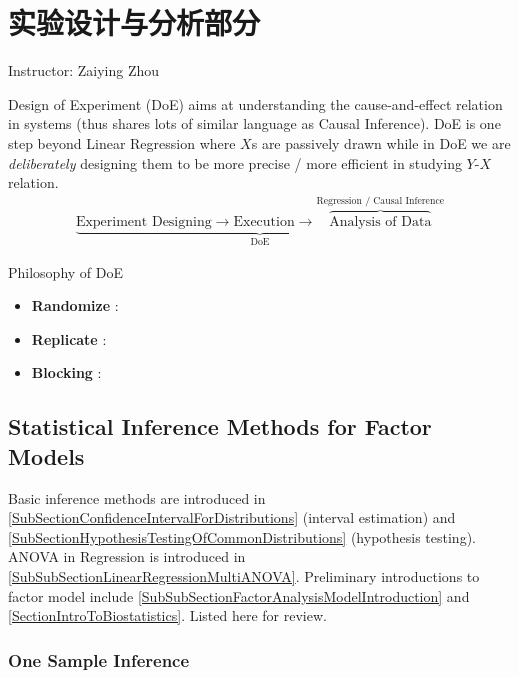 \chapter{实验设计与分析部分}\label{SectionDoE}
\begin{center}
    Instructor: Zaiying Zhou
\end{center}

Design of Experiment (DoE) aims at understanding the cause-and-effect relation in systems (thus shares lots of similar language as Causal Inference). DoE is one step beyond Linear Regression where $ X $s are passively drawn while in DoE we are \textit{deliberately} designing them to be more precise / more efficient in studying $ Y$-$X $ relation.
\begin{align}
    \underbrace{\text{Experiment Designing}\longrightarrow \text{Execution}\longrightarrow \overbrace{\text{Analysis of Data}}^{\text{Regression / Causal Inference}}}_{\text{DoE}}
\end{align}

\begin{point}
    Philosophy of DoE 
\end{point}

\begin{itemize}[topsep=2pt,itemsep=0pt]
    \item \textbf{ Randomize }: 
    \item \textbf{ Replicate  }:
    \item \textbf{ Blocking  }: 
\end{itemize}

    

\section{Statistical Inference Methods for Factor Models}

Basic inference methods are introduced in \autoref{SubSectionConfidenceIntervalForDistributions} (interval estimation) and \autoref{SubSectionHypothesisTestingOfCommonDistributions} (hypothesis testing). ANOVA in Regression is introduced in \autoref{SubSubSectionLinearRegressionMultiANOVA}. Preliminary introductions to factor model include \autoref{SubSubSectionFactorAnalysisModelIntroduction} and \autoref{SectionIntroToBiostatistics}. Listed here for review.


\subsection{One Sample Inference}


